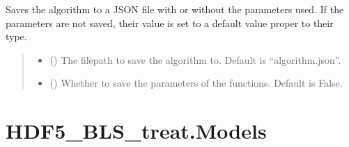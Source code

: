\documentclass[letterpaper,10pt,english]{sphinxmanual}
\begin{document}
\begin{fulllineitems}
\begin{fulllineitems}
\label{\detokenize{source/_autosummary/HDF5_BLS_treat.Treat_backend:HDF5_BLS_treat.Treat_backend.silent_save_algorithm}}
\pysigstartsignatures
\pysiglinewithargsret
{}
{\sphinxparamcomma {}}
{}
\pysigstopsignatures
\sphinxAtStartPar
Saves the algorithm to a JSON file with or without the parameters used. If the parameters are not saved, their value is set to a default value proper to their type.
\begin{quote}\begin{description}
\begin{itemize}
\item {} 
\sphinxAtStartPar
{} (\sphinxstyleliteralemphasis{\sphinxupquote{, }}) \textendash{} The filepath to save the algorithm to. Default is “algorithm.json”.

\item {} 
\sphinxAtStartPar
{} (\sphinxstyleliteralemphasis{\sphinxupquote{, }}) \textendash{} Whether to save the parameters of the functions. Default is False.

\end{itemize}

\end{description}\end{quote}

\end{fulllineitems}


\end{fulllineitems}


\sphinxstepscope


\section{HDF5\_BLS\_treat.Models}
\label{\detokenize{source/_autosummary/HDF5_BLS_treat.Models:hdf5-bls-treat-models}}\label{\detokenize{source/_autosummary/HDF5_BLS_treat.Models::doc}}
\end{document}
